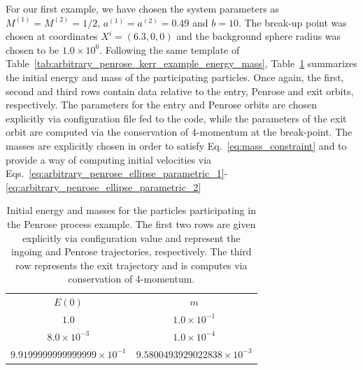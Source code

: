 For our first example, we have chosen the system parameters as $M^{(1)} = M^{(2)} = 1/2$, $a^{(1)} = a^{(2)} = 0.49$ and $b = 10$. The break-up point was chosen at coordinates $X^i = (6.3, 0, 0)$ and the background sphere radius was chosen to be $1.0 \times 10^6$. Following the same template of Table~\ref{tab:arbitrary_penrose_kerr_example_energy_mass}, Table~\ref{tab:arbitrary_penrose_sks_example_energy_mass} summarizes the initial energy and mass of the participating particles. Once again, the first, second and third rows contain data relative to the entry, Penrose and exit orbits, respectively. The parameters for the entry and Penrose orbits are chosen explicitly via configuration file fed to the code, while the parameters of the exit orbit are computed via the conservation of 4-momentum at the break-point. The masses are explicitly chosen in order to satisfy Eq.~\eqref{eq:mass_constraint} and to provide a way of computing initial velocities via Eqs.~\eqref{eq:arbitrary_penrose_ellipse_parametric_1}-\eqref{eq:arbitrary_penrose_ellipse_parametric_2}
%
\begin{table}[]
  \centering
  \begin{tabular}{cc}
    \hline\hline
    $E(0)$                              & $m$                                 \\
    $1.0$                               & $1.0 \times 10^{-1}$                \\
    $8.0 \times 10^{-3}$                & $1.0 \times 10^{-4}$                \\
    $9.9199999999999999 \times 10^{-1}$ & $9.5800493929022838 \times 10^{-3}$ \\ \hline\hline
  \end{tabular}
  \caption{Initial energy and masses for the particles participating in the Penrose process example. The first two rows are given explicitly via configuration value and represent the ingoing and Penrose trajectories, respectively. The third row represents the exit trajectory and is computes via conservation of 4-momentum.}
  \label{tab:arbitrary_penrose_sks_example_energy_mass}
\end{table}

